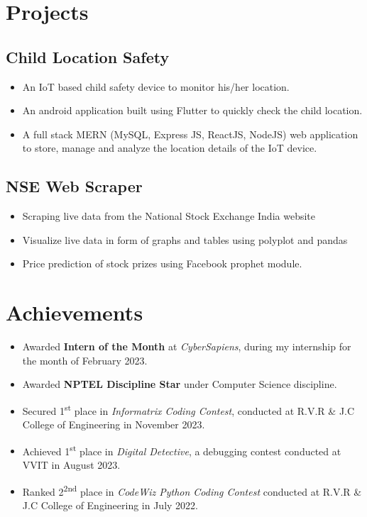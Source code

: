 \documentclass[]{roshan-resume}
\begin{document}
\begin{minipage}[t]{0.66\textwidth}
		\section{Projects}
		\subsection{Child Location Safety} 
		\begin{itemize}
			\item An IoT based child safety device to monitor his/her location.
			\item An android application built using Flutter to quickly check the child location.
			\item A full stack MERN (MySQL, Express JS, ReactJS, NodeJS) web application to store, manage and analyze the location details of the IoT device.
		\end{itemize}
		
		\subsection{NSE Web Scraper}
		\begin{itemize}
			\item Scraping live data from the National Stock Exchange India website
			\item Visualize live data in form of graphs and tables using polyplot and pandas
			\item Price prediction of stock prizes using Facebook prophet module.
		\end{itemize}
		
		
		
		
		\section{Achievements} 
		\begin{itemize}
			\item Awarded \textbf{Intern of the Month} at \textit{CyberSapiens}, during my internship for the month of February 2023.
			\item Awarded \textbf{NPTEL Discipline Star} under Computer Science discipline.
			\item Secured 1\textsuperscript{st} place in \textit{Informatrix Coding Contest}, conducted at R.V.R \& J.C College of Engineering in November 2023.
			\item Achieved 1\textsuperscript{st} place in \textit{Digital Detective}, a debugging contest conducted at VVIT in August 2023.
			\item Ranked 2\textsuperscript{2nd} place in \textit{CodeWiz Python Coding Contest} conducted at R.V.R \& J.C College of Engineering in July 2022.
		\end{itemize}
		

\end{minipage}
\end{document}
